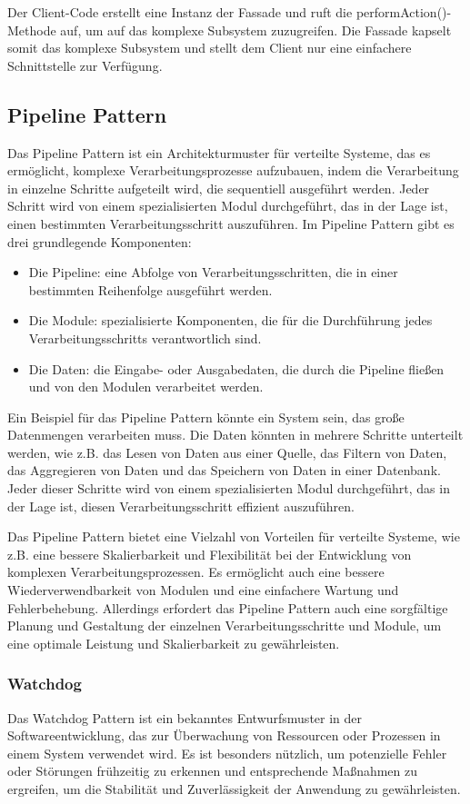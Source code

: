 \documentclass[../vs-script-first-v01.tex]{subfiles}
\begin{document}
Der Client-Code erstellt eine Instanz der Fassade und ruft die performAction()-Methode auf, um auf das komplexe Subsystem zuzugreifen. Die Fassade kapselt somit das komplexe Subsystem und stellt dem Client nur eine einfachere Schnittstelle zur Verfügung.




\subsection{Pipeline Pattern}
Das Pipeline Pattern ist ein Architekturmuster für verteilte Systeme, das es ermöglicht, komplexe Verarbeitungsprozesse aufzubauen, indem die Verarbeitung in einzelne Schritte aufgeteilt wird, die sequentiell ausgeführt werden. Jeder Schritt wird von einem spezialisierten Modul durchgeführt, das in der Lage ist, einen bestimmten Verarbeitungsschritt auszuführen. Im Pipeline Pattern gibt es drei grundlegende Komponenten:
\begin{itemize} 
\item Die Pipeline: eine Abfolge von Verarbeitungsschritten, die in einer bestimmten Reihenfolge ausgeführt werden.
\item Die Module: spezialisierte Komponenten, die für die Durchführung jedes Verarbeitungsschritts verantwortlich sind.
\item Die Daten: die Eingabe- oder Ausgabedaten, die durch die Pipeline fließen und von den Modulen verarbeitet werden.
\end{itemize} 
Ein Beispiel für das Pipeline Pattern könnte ein System sein, das große Datenmengen verarbeiten muss. Die Daten könnten in mehrere Schritte unterteilt werden, wie z.B. das Lesen von Daten aus einer Quelle, das Filtern von Daten, das Aggregieren von Daten und das Speichern von Daten in einer Datenbank. Jeder dieser Schritte wird von einem spezialisierten Modul durchgeführt, das in der Lage ist, diesen Verarbeitungsschritt effizient auszuführen.

Das Pipeline Pattern bietet eine Vielzahl von Vorteilen für verteilte Systeme, wie z.B. eine bessere Skalierbarkeit und Flexibilität bei der Entwicklung von komplexen Verarbeitungsprozessen. Es ermöglicht auch eine bessere Wiederverwendbarkeit von Modulen und eine einfachere Wartung und Fehlerbehebung. Allerdings erfordert das Pipeline Pattern auch eine sorgfältige Planung und Gestaltung der einzelnen Verarbeitungsschritte und Module, um eine optimale Leistung und Skalierbarkeit zu gewährleisten.

\subsubsection{Watchdog}
Das Watchdog Pattern ist ein bekanntes Entwurfsmuster in der Softwareentwicklung, das zur Überwachung von Ressourcen oder Prozessen in einem System verwendet wird. Es ist besonders nützlich, um potenzielle Fehler oder Störungen frühzeitig zu erkennen und entsprechende Maßnahmen zu ergreifen, um die Stabilität und Zuverlässigkeit der Anwendung zu gewährleisten.
\end{document}
